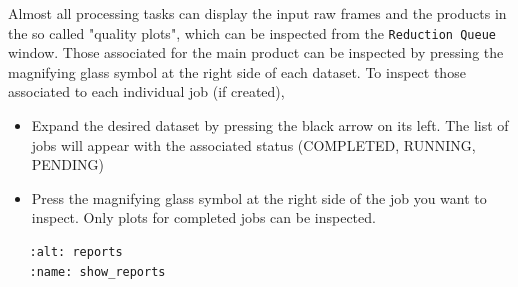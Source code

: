 Almost all processing tasks can display the input raw frames and the products in the so called "quality plots", which
can be inspected from the \texttt{Reduction Queue} window.
Those associated for the main product can be inspected by pressing the magnifying glass symbol at the right side of each dataset.
To inspect those associated to each individual job (if created), 

\begin{itemize}
\item Expand the desired dataset by pressing the black arrow on its left. The list of jobs will appear with the associated status (COMPLETED, RUNNING, PENDING)
\end{itemize}
\begin{itemize}
\item Press the  magnifying glass symbol at the right side of the job you want to inspect. Only plots for completed jobs can be inspected.
\end{itemize}


\begin{verbatim}
   :alt: reports
   :name: show_reports
\end{verbatim}

            
